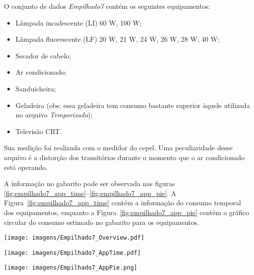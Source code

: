 O conjunto de dados \emph{Empilhado7} contém os seguintes
equipamentos:

\begin{itemize}
\item Lâmpada incadescente (LI) 60 W, 100 W;
\item Lâmpada fluorescente (LF) 20 W, 21 W, 24 W, 26 W, 28 W, 40 W;
\item Secador de cabelo;
\item Ar condicionado;
\item Sanduicheira;
\item Geladeira (obs: essa geladeira tem consumo bastante superior
àquele utilizada no arquivo \emph{Temporizado});
\item Televisão CRT.
\end{itemize}

Sua medição foi realizada com o medidor do \acs{cepel}. Uma
peculiaridade desse arquivo é a distorção dos transitórios durante o
momento que o ar condicionado está operando.

A informação no gabarito pode ser observada nas figuras
\ref{fig:empilhado7_app_time}--\ref{fig:empilhado7_app_pie}. 
A Figura~\ref{fig:empilhado7_app_time} contém a informação do consumo
temporal dos equipamentos, enquanto a Figura~\ref{fig:empilhado7_app_pie}
contém o gráfico circular do consumo estimado no gabarito para os
equipamentos.


\begin{sidewaysfigure}[p]
\centering
\texttt{[image: imagens/Empilhado7\_Overview.pdf]}
\caption{Perfil de consumo para o conjunto de dados \emph{Empilhado7}.}
\label{fig:empilhado7_overview}
\end{sidewaysfigure}

\begin{sidewaysfigure}[p]
\centering
\texttt{[image: imagens/Empilhado7\_AppTime.pdf]}
\caption{Informação no gabarito para o conjunto de dados
\emph{Empilhado7}: consumo temporal dos equipamentos.}
\label{fig:empilhado7_app_time}
\end{sidewaysfigure}

\begin{sidewaysfigure}[p]
\centering
\texttt{[image: imagens/Empilhado7\_AppPie.png]}
\caption{Informação no gabarito para o conjunto de dados
\emph{Empilhado7}: gráfico circular do consumo dos equipamentos.}
\label{fig:empilhado7_app_pie}
\end{sidewaysfigure}

